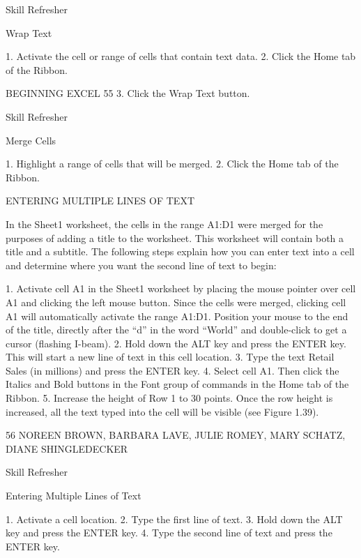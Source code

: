 Skill Refresher


Wrap Text

1. Activate the cell or range of cells that contain text data.
2. Click the Home tab of the Ribbon.



BEGINNING EXCEL 55
3. Click the Wrap Text button.




Skill Refresher


Merge Cells

1. Highlight a range of cells that will be merged.
2. Click the Home tab of the Ribbon.



ENTERING MULTIPLE LINES OF TEXT

In the Sheet1 worksheet, the cells in the range A1:D1 were merged for the purposes of adding a title
to the worksheet. This worksheet will contain both a title and a subtitle. The following steps explain
how you can enter text into a cell and determine where you want the second line of text to begin:

1. Activate cell A1 in the Sheet1 worksheet by placing the mouse pointer over cell A1 and clicking
the left mouse button. Since the cells were merged, clicking cell A1 will automatically activate
the range A1:D1. Position your mouse to the end of the title, directly after the “d” in the word
“World” and double-click to get a cursor (flashing I-beam).
2. Hold down the ALT key and press the ENTER key. This will start a new line of text in this cell
location.
3. Type the text Retail Sales (in millions) and press the ENTER key.
4. Select cell A1. Then click the Italics and Bold buttons in the Font group of commands in the
Home tab of the Ribbon.
5. Increase the height of Row 1 to 30 points. Once the row height is increased, all the text typed
into the cell will be visible (see Figure 1.39).




56 NOREEN BROWN, BARBARA LAVE, JULIE ROMEY, MARY SCHATZ, DIANE SHINGLEDECKER




Skill Refresher


Entering Multiple Lines of Text

1. Activate a cell location.
2. Type the first line of text.
3. Hold down the ALT key and press the ENTER key.
4. Type the second line of text and press the ENTER key.



